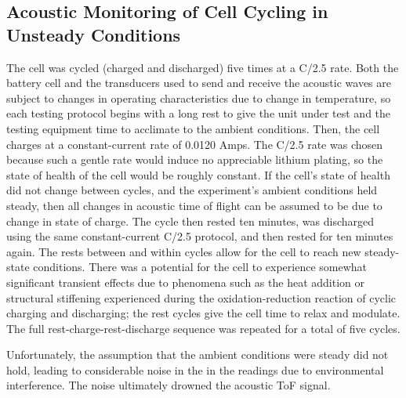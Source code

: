 \subsection{Acoustic Monitoring of Cell Cycling in Unsteady Conditions}

The cell was cycled (charged and discharged) five times at a C/2.5 rate. 
Both the battery cell and the transducers used to send and receive the acoustic waves are subject to changes in operating characteristics due to change in temperature, so each testing protocol begins with a long rest to give the unit under test and the testing equipment time to acclimate to the ambient conditions. 
Then, the cell charges at a constant-current rate of 0.0120 Amps. 
The C/2.5 rate was chosen because such a gentle rate would induce no appreciable lithium plating, so the state of health of the cell would be roughly constant. 
If the cell's state of health did not change between cycles, and the experiment's ambient conditions held steady, then all changes in acoustic time of flight can be assumed to be due to change in state of charge.
The cycle then rested ten minutes, was discharged using the same constant-current C/2.5 protocol, and then rested for ten minutes again. 
The rests between and within cycles allow for the cell to reach new steady-state conditions. 
There was a potential for the cell to experience somewhat significant transient effects due to phenomena such as the heat addition or structural stiffening experienced during the oxidation-reduction reaction of cyclic charging and discharging; the rest cycles give the cell time to relax and modulate.
The full rest-charge-rest-discharge sequence was repeated for a total of five cycles.


Unfortunately, the assumption that the ambient conditions were steady did not hold, leading to considerable noise in the in the readings due to environmental interference. The noise ultimately drowned the acoustic ToF signal.

    
